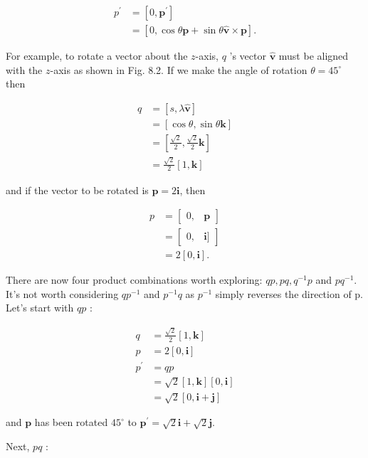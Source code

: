 \documentclass[10pt]{article}
\begin{document}
$$
\begin{aligned}
p^{\prime} & =\left[0, \mathbf{p}^{\prime}\right] \\
& =[0, \cos \theta \mathbf{p}+\sin \theta \hat{\mathbf{v}} \times \mathbf{p}] .
\end{aligned}
$$

For example, to rotate a vector about the $z$-axis, $q$ 's vector $\hat{\mathbf{v}}$ must be aligned with the $z$-axis as shown in Fig. 8.2. If we make the angle of rotation $\theta=45^{\circ}$ then

$$
\begin{aligned}
q & =[s, \lambda \hat{\mathbf{v}}] \\
& =[\cos \theta, \sin \theta \mathbf{k}] \\
& =\left[\frac{\sqrt{2}}{2}, \frac{\sqrt{2}}{2} \mathbf{k}\right] \\
& =\frac{\sqrt{2}}{2}[1, \mathbf{k}]
\end{aligned}
$$

and if the vector to be rotated is $\mathbf{p}=2 \mathbf{i}$, then

$$
\begin{aligned}
p & =\left[\begin{array}{ll}
0, & \mathbf{p}
\end{array}\right] \\
& =\left[\begin{array}{ll}
0, & \mathbf{i}]
\end{array}\right] \\
& =2[0, \mathbf{i}] .
\end{aligned}
$$

There are now four product combinations worth exploring: $q p, p q, q^{-1} p$ and $p q^{-1}$. It's not worth considering $q p^{-1}$ and $p^{-1} q$ as $p^{-1}$ simply reverses the direction of p. Let's start with $q p$ :

$$
\begin{aligned}
q & =\frac{\sqrt{2}}{2}[1, \mathbf{k}] \\
p & =2[0, \mathbf{i}] \\
p^{\prime} & =q p \\
& =\sqrt{2}[1, \mathbf{k}][0, \mathbf{i}] \\
& =\sqrt{2}[0, \mathbf{i}+\mathbf{j}]
\end{aligned}
$$

and $\mathbf{p}$ has been rotated $45^{\circ}$ to $\mathbf{p}^{\prime}=\sqrt{2} \mathbf{i}+\sqrt{2} \mathbf{j}$.

Next, $p q$ :
\end{document}
